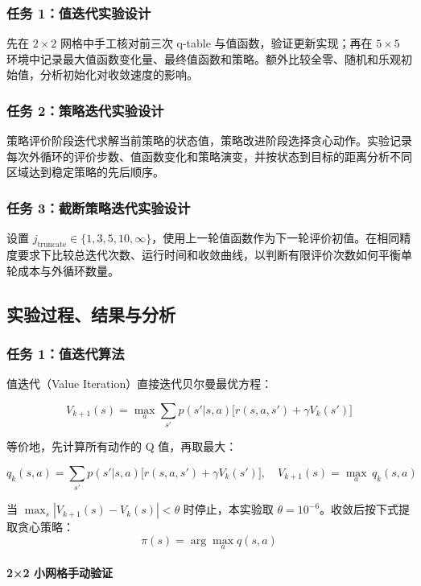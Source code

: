 \documentclass[11pt,a4paper,UTF8]{ctexart}
\numberwithin{figure}{section}
\numberwithin{table}{section}
\begin{document}
\subsubsection{任务 1：值迭代实验设计}

先在 $2\times2$ 网格中手工核对前三次 q-table 与值函数，验证更新实现；再在 $5\times5$ 环境中记录最大值函数变化量、最终值函数和策略。额外比较全零、随机和乐观初始值，分析初始化对收敛速度的影响。

\subsubsection{任务 2：策略迭代实验设计}

策略评价阶段迭代求解当前策略的状态值，策略改进阶段选择贪心动作。实验记录每次外循环的评价步数、值函数变化和策略演变，并按状态到目标的距离分析不同区域达到稳定策略的先后顺序。

\subsubsection{任务 3：截断策略迭代实验设计}

设置 $j_{\text{truncate}}\in\{1,3,5,10,\infty\}$，使用上一轮值函数作为下一轮评价初值。在相同精度要求下比较总迭代次数、运行时间和收敛曲线，以判断有限评价次数如何平衡单轮成本与外循环数量。




\subsection{实验过程、结果与分析}

\subsubsection{任务 1：值迭代算法}

值迭代（Value Iteration）直接迭代贝尔曼最优方程：

$$V_{k+1}(s) = \max_a \sum_{s'} p(s'|s,a)\bigl[r(s,a,s') + \gamma V_k(s')\bigr]$$

等价地，先计算所有动作的 Q 值，再取最大：

$$q_k(s,a) = \sum_{s'} p(s'|s,a)\bigl[r(s,a,s') + \gamma V_k(s')\bigr], \quad V_{k+1}(s) = \max_a\, q_k(s,a)$$

当 $\max_s |V_{k+1}(s)-V_k(s)|<\theta$ 时停止，本实验取 $\theta=10^{-6}$。收敛后按下式提取贪心策略：
\[
\pi(s)=\arg\max_a q(s,a)
\]

\paragraph{2×2 小网格手动验证}
\end{document}
